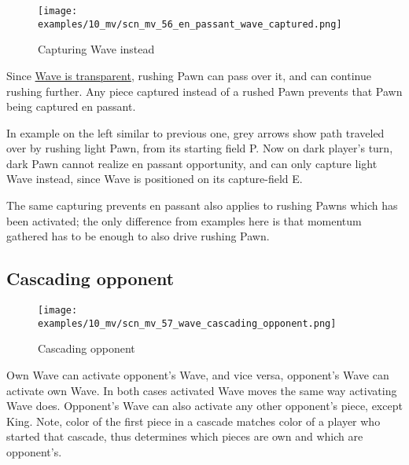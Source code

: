 \vspace*{1.7\baselineskip}
\noindent
\begin{wrapfigure}[13]{l}{0.4\textwidth}
\centering
\texttt{[image: examples/10\_mv/scn\_mv\_56\_en\_passant\_wave\_captured.png]}
\vspace*{-1.4\baselineskip}
\caption{Capturing Wave instead}
\label{fig:scn_mv_56_en_passant_wave_captured}
\end{wrapfigure}
Since \hyperref[fig:scn_mv_07_wave_is_transparent]{Wave is transparent}, rushing
Pawn can pass over it, and can continue rushing further. Any piece captured instead
of a rushed Pawn prevents that Pawn being captured en passant.

In example on the left similar to previous one, grey arrows show path traveled
over by rushing light Pawn, from its starting field P. Now on dark player's turn,
dark Pawn cannot realize en passant opportunity, and can only capture light Wave
instead, since Wave is positioned on its capture-field E.

The same capturing prevents en passant also applies to rushing Pawns which has
been activated; the only difference from examples here is that momentum gathered
has to be enough to also drive rushing Pawn.

\clearpage %

\subsection*{Cascading opponent}
\label{sec:Miranda's veil/Wave/Cascading opponent}

\vspace*{-1.4\baselineskip}
\noindent
\begin{figure}[h]
\texttt{[image: examples/10\_mv/scn\_mv\_57\_wave\_cascading\_opponent.png]}
\caption{Cascading opponent}
\label{fig:scn_mv_57_wave_cascading_opponent}
\end{figure}

Own Wave can activate opponent's Wave, and vice versa, opponent's Wave can activate
own Wave. In both cases activated Wave moves the same way activating Wave does.
Opponent's Wave can also activate any other opponent's piece, except King. Note,
color of the first piece in a cascade matches color of a player who started that
cascade, thus determines which pieces are own and which are opponent's.

